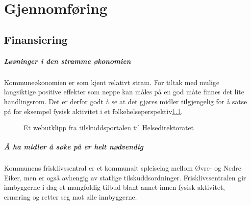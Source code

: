 \documentclass[12pt]{memoir} %
\begin{document}
\chapter{Gjennomføring}
	\section{Finansiering}
		\paragraph{Løsninger i den stramme økonomien\\}
			Kommuneøkonomien er som kjent relativt stram. For tiltak med mulige langsiktige positive effekter som neppe kan måles på en god måte finnes det lite handlingsrom. Det er derfor godt å se at det gjøres midler tilgjengelig for å satse på for eksempel fysisk aktivitet i et folkehelseperspektiv\ref{faktfhfig}.
					\begin{figure}[h]
                      \centering
                    	  \captionsetup{singlelinecheck=off}
                      	\caption{Et webutklipp fra tilskuddsportalen til Helsedirektoratet}
                      	\label{faktfhfig}
                    \end{figure}   
        \paragraph{Å ha midler å søke på er helt nødvendig\\}
            Kommunens frisklivssentral er et kommunalt spleiselag mellom Øvre- og Nedre Eiker, men er også avhengig av statlige tilskuddsordninger. Frisklivssentralen gir innbyggerne i dag et mangfoldig tilbud blant annet innen fysisk aktivitet, ernæring og retter seg mot alle innbyggerne.\\
\end{document}
